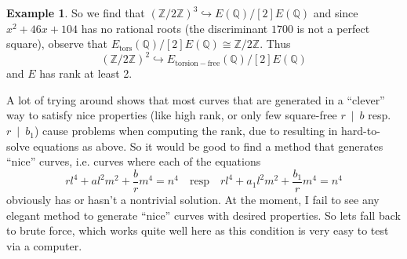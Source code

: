 \documentclass{scrartcl}
\newcommand{\Z}{\mathbb{Z}}
\newcommand{\Q}{\mathbb{Q}}
\newcommand{\divides}{\ \mid \ }
\theoremstyle{definition}
\newtheorem{example}[subsection]{Example}
\begin{document}
\begin{example}
    So we find that $(\Z/2\Z)^3 \hookrightarrow E(\Q)/[2]E(\Q)$ and since $x^2 + 46 x + 104$ has no rational roots (the discriminant $1700$ is not a perfect square), observe that $E_{\mathrm{tors}}(\Q) / [2]E(\Q) \cong \Z/2\Z$.
    Thus
    \begin{equation*}
        (\Z/2\Z)^2 \hookrightarrow E_{\mathrm{torsion-free}}(\Q)/[2]E(\Q)
    \end{equation*}
    and $E$ has rank at least 2.
\end{example}
A lot of trying around shows that most curves that are generated in a ``clever'' way to satisfy nice properties (like high rank, or only few square-free $r \divides b$ resp. $r \divides b_1$) cause problems when computing the rank, due to resulting in hard-to-solve equations as above.
So it would be good to find a method that generates ``nice'' curves, i.e. curves where each of the equations
\begin{equation*}
    r l^4 + a l^2 m^2 + \frac b r m^4 = n^4 \quad \text{resp} \quad r l^4 + a_1 l^2 m^2 + \frac {b_1} r m^4 = n^4
\end{equation*}
obviously has or hasn't a nontrivial solution.
At the moment, I fail to see any elegant method to generate ``nice'' curves with desired properties.
So lets fall back to brute force, which works quite well here as this condition is very easy to test via a computer.
\end{document}
